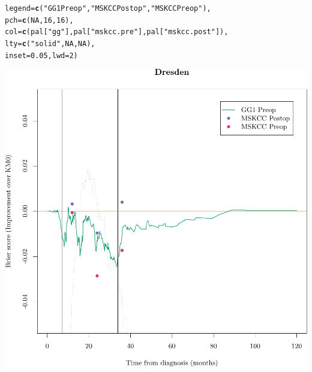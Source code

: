 \documentclass{article}\usepackage[]{graphicx}\usepackage[]{color}
\makeatletter
\def\maxwidth{ %
  \ifdim\Gin@nat@width>\linewidth
    \linewidth
  \else
    \Gin@nat@width
  \fi
}
\newcommand{\hlnum}[1]{\textcolor[rgb]{0.686,0.059,0.569}{#1}}%
\newcommand{\hlstr}[1]{\textcolor[rgb]{0.192,0.494,0.8}{#1}}%
\newcommand{\hlstd}[1]{\textcolor[rgb]{0.345,0.345,0.345}{#1}}%
\newcommand{\hlkwc}[1]{\textcolor[rgb]{0.333,0.667,0.333}{#1}}%
\newcommand{\hlkwd}[1]{\textcolor[rgb]{0.737,0.353,0.396}{\textbf{#1}}}%
\newenvironment{kframe}{%
 \def\at@end@of@kframe{}%
 \ifinner\ifhmode%
  \def\at@end@of@kframe{\end{minipage}}%
  \begin{minipage}{\columnwidth}%
 \fi\fi%
 \def\FrameCommand##1{\hskip\@totalleftmargin \hskip-\fboxsep
 \colorbox{shadecolor}{##1}\hskip-\fboxsep
     \hskip-\linewidth \hskip-\@totalleftmargin \hskip\columnwidth}%
 \MakeFramed {\advance\hsize-\width
   \@totalleftmargin\z@ \linewidth\hsize
   \@setminipage}}%
 {\par\unskip\endMakeFramed%
 \at@end@of@kframe}
\newenvironment{knitrout}{}{} %
\makeatother
\begin{document}
\begin{knitrout}
\begin{kframe}
\begin{alltt}
        \hlkwc{legend} \hlstd{=} \hlkwd{c}\hlstd{(}     \hlstr{"GG1 Preop"}\hlstd{,}    \hlstr{"MSKCC Postop"}\hlstd{,}         \hlstr{"MSKCC Preop"}\hlstd{),}
        \hlkwc{pch} \hlstd{=} \hlkwd{c}\hlstd{(}        \hlnum{NA}\hlstd{,}                     \hlnum{16}\hlstd{,}                             \hlnum{16}\hlstd{),}
        \hlkwc{col} \hlstd{=} \hlkwd{c}\hlstd{(        pal[}\hlstr{"gg"}\hlstd{],              pal[}\hlstr{"mskcc.pre"}\hlstd{],       pal[}\hlstr{"mskcc.post"}\hlstd{]),}
        \hlkwc{lty} \hlstd{=} \hlkwd{c}\hlstd{(}        \hlstr{"solid"}\hlstd{,}                \hlnum{NA}\hlstd{,}                             \hlnum{NA}\hlstd{),}
        \hlkwc{inset} \hlstd{=} \hlnum{0.05}\hlstd{,} \hlkwc{lwd} \hlstd{=} \hlnum{2}\hlstd{)}
\end{alltt}
\end{kframe}

{\centering \includegraphics[width=\maxwidth]{figure/07-prob-bs-paths-plot-dresden-3} 

}



\end{knitrout}
\end{document}
